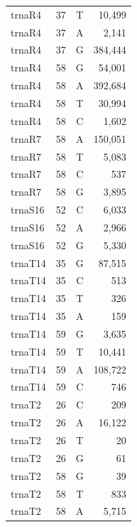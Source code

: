 \documentclass[12pt]{rockefeller}
\begin{document}
{\begin{center}
\begin{supertabular}{|l|r|c|r|}
  trnaR4 &        37 &          T &     10,499 \\
  trnaR4 &        37 &          A &      2,141 \\
  trnaR4 &        37 &          G &    384,444 \\
  trnaR4 &        58 &          G &     54,001 \\
  trnaR4 &        58 &          A &    392,684 \\
  trnaR4 &        58 &          T &     30,994 \\
  trnaR4 &        58 &          C &      1,602 \\
  trnaR7 &        58 &          A &    150,051 \\
  trnaR7 &        58 &          T &      5,083 \\
  trnaR7 &        58 &          C &        537 \\
  trnaR7 &        58 &          G &      3,895 \\
 trnaS16 &        52 &          C &      6,033 \\
 trnaS16 &        52 &          A &      2,966 \\
 trnaS16 &        52 &          G &      5,330 \\
 trnaT14 &        35 &          G &     87,515 \\
 trnaT14 &        35 &          C &        513 \\
 trnaT14 &        35 &          T &        326 \\
 trnaT14 &        35 &          A &        159 \\
 trnaT14 &        59 &          G &      3,635 \\
 trnaT14 &        59 &          T &     10,441 \\
 trnaT14 &        59 &          A &    108,722 \\
 trnaT14 &        59 &          C &        746 \\
  trnaT2 &        26 &          C &        209 \\
  trnaT2 &        26 &          A &     16,122 \\
  trnaT2 &        26 &          T &         20 \\
  trnaT2 &        26 &          G &         61 \\
  trnaT2 &        58 &          G &         39 \\
  trnaT2 &        58 &          T &        833 \\
  trnaT2 &        58 &          A &      5,715 \\

\end{supertabular}
\end{center}}
\end{document}
